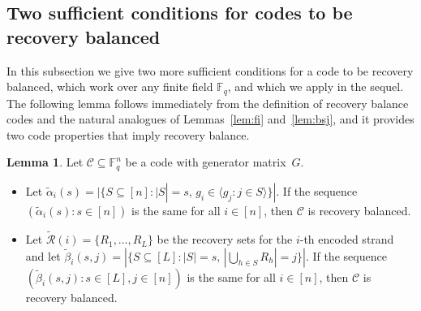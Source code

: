 \documentclass[11pt,a4paper,reqno,twoside]{amsart}
\theoremstyle{definition}
\newtheorem{remark}{Remark}
\newtheorem{lemma}{Lemma}
\newcommand{\F}{\mathbb{F}}
\newcommand{\E}{\mathbb{E}}
\newcommand{\mC}{\mathcal{C}}
\newcommand{\mR}{\mathcal{R}}
\begin{document}
\subsection{Two sufficient conditions for codes to be recovery balanced}
In this subsection we give two more sufficient conditions for a code to be recovery balanced, which work over any finite field $\F_q$, and which we apply in the sequel. 
The following lemma follows immediately from the definition of recovery
balance codes and 
the natural analogues of Lemmas~\ref{lem:fi} and~\ref{lem:bsj}, and it provides two code properties that imply recovery balance.


\begin{lemma} \label{lem:recba}
Let $\mC \subseteq \F_q^n$ be a code with generator matrix~$G$.
\begin{itemize}
    \item[(i)] Let $\widetilde{\alpha}_i(s)={|\{S \subseteq [n] : |S| = s, \, g_i \in \langle g_j : j \in S\rangle \}|}$. If the sequence $(\widetilde{\alpha}_i(s) : s \in [n])$ is the same for all $i \in [n]$, then $\mC$ is recovery balanced. 
    \item[(ii)] Let $\widetilde{\mR}(i)=\{R_1,\dots,R_L\}$ be the recovery sets for the $i$-th encoded strand
    and let $\widetilde{\beta}_i(s,j) = \left| \{ S \subseteq [L] : |S|=s, \,|\bigcup_{h \in S} R_h | = j  \}  \right|$.
    If the sequence $(\widetilde{\beta}_i(s,j) : s \in [L], j \in [n])$ is the same for all $i \in [n]$, then $\mC$ is recovery balanced. 
\end{itemize}
\end{lemma}
\end{document}
